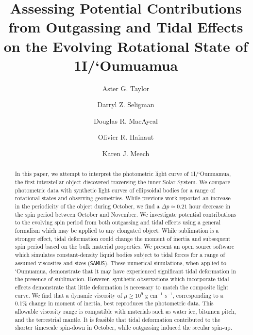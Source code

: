 \documentclass[twocolumn,doublespacing]{aastex631}
\begin{document}
\title{Assessing Potential Contributions from Outgassing and Tidal Effects on the Evolving Rotational State of 1I/`Oumuamua}

\author[0000-0002-0140-4475]{Aster G. Taylor}

\author[0000-0002-0726-6480]{Darryl Z. Seligman}

\author[0000-0003-0647-6176]{Douglas R. MacAyeal}

\author[0000-0001-6952-9349]{Olivier R. Hainaut}

\author[0000-0002-2058-5670]{Karen J. Meech}

\begin{abstract}

In this paper, we attempt to interpret the photometric light curve of 1I/`Oumuamua, the first interstellar object discovered traversing the inner Solar System. We compare photometric data with synthetic light curves of ellipsoidal bodies for a range of rotational states and observing geometries. While previous work reported an increase in the periodicity of the object during October, we find a $\Delta p\simeq0.21$ hour decrease in the spin period between October and November. We investigate potential contributions to the evolving spin period from both outgassing and tidal effects using a general formalism which may be applied to any elongated object. While sublimation is a stronger effect, tidal deformation could change the moment of inertia and subsequent spin period based on the bulk material properties. We present an open source software which simulates constant-density liquid bodies subject to tidal forces for a range of assumed viscosites and sizes (\texttt{SAMUS}). These numerical simulations, when applied to `Oumuamua, demonstrate that it may have experienced significant tidal deformation in the presence of sublimation. However, synthetic observations which incorporate tidal effects demonstrate that little deformation is necessary to match the composite light curve. We find that a dynamic viscosity of $\mu\geq10^9$ g cm$^{-1}$ s$^{-1}$, corresponding to a 0.1\% change in moment of inertia, best reproduces the photometric data. This allowable viscosity range is compatible with materials such as water ice, bitumen pitch, and the terrestrial mantle. It is feasible that tidal deformation contributed to the shorter timescale spin-down in October, while outgassing induced the secular spin-up. 

\end{abstract}
\end{document}
